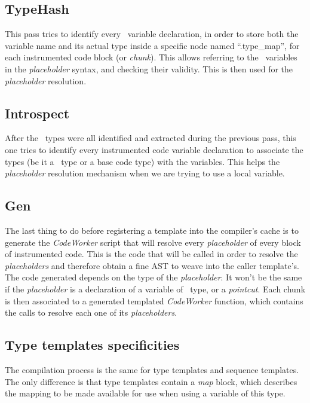 \documentclass[american]{rtxreport}
\begin{document}
\subsection{TypeHash}

This pass tries to identify every \rtx\ variable declaration, in order to store
both the variable name and its actual type inside a specific node named
``.type\_map'', for each instrumented code block (or \emph{chunk}). This allows
referring to the \rtx\ variables in the \emph{placeholder} syntax, and checking
their validity. This is then used for the \emph{placeholder} resolution.

\subsection{Introspect}

After the \rtx\ types were all identified and extracted during the previous
pass, this one tries to identify every instrumented code variable declaration
to associate the types (be it a \rtx\ type or a base code type) with the
variables. This helps the \emph{placeholder} resolution mechanism when we are
trying to use a local variable.

\subsection{Gen}

The last thing to do before registering a template into the compiler's cache is
to generate the \emph{CodeWorker} script that will resolve every
\emph{placeholder} of every block of instrumented code. This is the code that
will be called in order to resolve the \emph{placeholders} and therefore obtain
a fine AST to weave into the caller template's. The code generated
depends on the type of the \emph{placeholder}. It won't be the same if the
\emph{placeholder} is a declaration of a variable of \rtx\ type, or a
\emph{pointcut}. Each chunk is then associated to a generated templated
\emph{CodeWorker} function, which contains the calls to resolve each
one of its \emph{placeholders}.

\subsection{Type templates specificities}

The compilation process is the same for type templates and sequence templates.
The only difference is that type templates contain a \emph{map} block,
which describes the mapping to be made available for use when using a variable
of this type.
\end{document}
